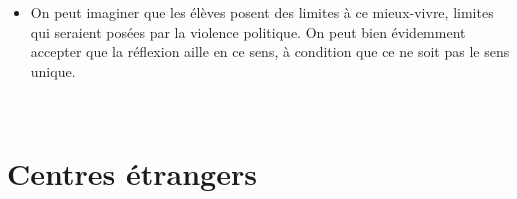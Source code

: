 {\begin{itemize}
{avec des références partagées}. L'apprentissage des  de , la lecture
de comédies de  sont autant d'expériences communes à tous les écoliers et
collégiens de France, qui nous permettent de construire une culture commune
essentielle pour vivre ensemble et se comprendre, mais qui forment aussi l'esprit
critique, contribuent à forger des valeurs et des repères communs.
\item On peut imaginer que les élèves posent des limites à ce mieux-vivre, limites qui
seraient posées par la violence politique. On peut bien évidemment accepter que la
réflexion aille en ce sens, à condition que ce ne soit pas le sens unique.
\end{itemize}}

\vfill{~}\clearpage

\section{Centres étrangers}

